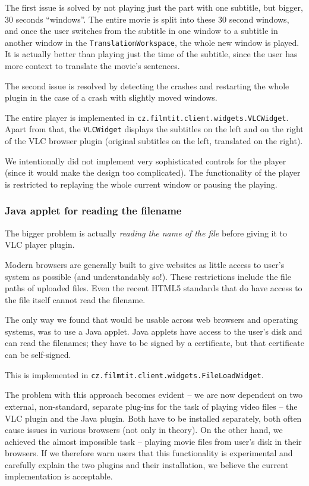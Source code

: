 The first issue is solved by not playing just the part with one subtitle, but bigger, 30 seconds ``windows''. The entire movie is split into these 30 second windows, and once the user switches from the subtitle in one window to a subtitle in another window in the {\tt TranslationWorkspace}, the whole new window is played. It is actually better than playing just the time of the subtitle, since the user has more context to translate the movie's sentences.

The second issue is resolved by detecting the crashes and restarting the whole plugin in the case of a crash with slightly moved windows.

The entire player is implemented in \texttt{cz.filmtit.client.widgets.VLCWidget}. Apart from that, the \texttt{VLCWidget} displays the subtitles on the left and on the right of the VLC browser plugin (original subtitles on the left, translated on the right).

We intentionally did not implement very sophisticated controls for the player (since it would make the design too complicated). The functionality of the player is restricted to replaying the whole current window or pausing the playing.

\subsubsection*{Java applet for reading the filename}
The bigger problem is actually \emph{reading the name of the file} before giving it to VLC player plugin.

Modern browsers are generally built to give websites as little access to user's system as possible (and understandably so!). These restrictions include the file paths of uploaded files. Even the recent HTML5 standards that do have access to the file itself cannot read the filename.

The only way we found that would be usable across web browsers and operating systems, was to use a Java applet. Java applets have access to the user's disk and can read the filenames; they have to be signed by a certificate, but that certificate can be self-signed.

This is implemented in \texttt{cz.filmtit.client.widgets.FileLoadWidget}.

The problem with this approach becomes evident -- we are now dependent on two external, non-standard, separate plug-ins for the task of playing video files -- the VLC plugin and the Java plugin. Both have to be installed separately, both often cause issues in various browsers (not only in theory). On the other hand, we achieved the almost impossible task -- playing movie files from user's disk in their browsers. If we therefore warn users that this functionality is experimental and carefully explain the two plugins and their installation, we believe the current implementation is acceptable.



